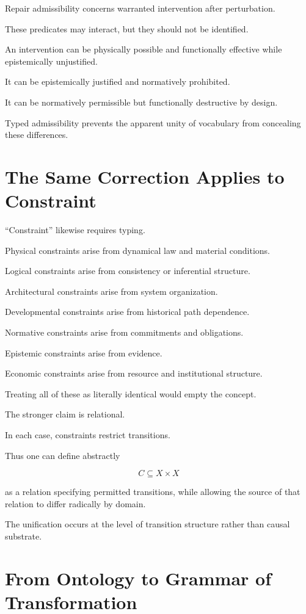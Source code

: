 \documentclass[11pt]{article}
\theoremstyle{remark}
\begin{document}
Repair admissibility concerns warranted intervention after perturbation.

These predicates may interact, but they should not be identified.

An intervention can be physically possible and functionally effective while epistemically unjustified.

It can be epistemically justified and normatively prohibited.

It can be normatively permissible but functionally destructive by design.

Typed admissibility prevents the apparent unity of vocabulary from concealing these differences.

\section{The Same Correction Applies to Constraint}

``Constraint'' likewise requires typing.

Physical constraints arise from dynamical law and material conditions.

Logical constraints arise from consistency or inferential structure.

Architectural constraints arise from system organization.

Developmental constraints arise from historical path dependence.

Normative constraints arise from commitments and obligations.

Epistemic constraints arise from evidence.

Economic constraints arise from resource and institutional structure.

Treating all of these as literally identical would empty the concept.

The stronger claim is relational.

In each case, constraints restrict transitions.

Thus one can define abstractly

\begin{equation}
C
\subseteq
X\times X
\end{equation}

as a relation specifying permitted transitions, while allowing the source of that relation to differ radically by domain.

The unification occurs at the level of transition structure rather than causal substrate.

\section{From Ontology to Grammar of Transformation}
\end{document}
